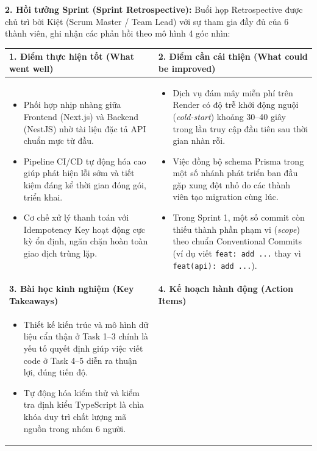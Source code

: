 \documentclass[a4paper]{article}
\begin{document}
\noindent\textbf{2. Hồi tưởng Sprint (Sprint Retrospective):}
Buổi họp Retrospective được chủ trì bởi Kiệt (Scrum Master / Team Lead) với sự tham gia đầy đủ của 6 thành viên, ghi nhận các phản hồi theo mô hình 4 góc nhìn:

\begin{table}[H]
\centering
\small
\begin{tabularx}{\textwidth}{|X|X|}
\hline
\textbf{1. Điểm thực hiện tốt (What went well)} & \textbf{2. Điểm cần cải thiện (What could be improved)} \\
\hline
\begin{itemize}[leftmargin=10pt]
    \item Phối hợp nhịp nhàng giữa Frontend (Next.js) và Backend (NestJS) nhờ tài liệu đặc tả API chuẩn mực từ đầu.
    \item Pipeline CI/CD tự động hóa cao giúp phát hiện lỗi sớm và tiết kiệm đáng kể thời gian đóng gói, triển khai.
    \item Cơ chế xử lý thanh toán với Idempotency Key hoạt động cực kỳ ổn định, ngăn chặn hoàn toàn giao dịch trùng lặp.
\end{itemize} & 
\begin{itemize}[leftmargin=10pt]
    \item Dịch vụ đám mây miễn phí trên Render có độ trễ khởi động nguội (\textit{cold-start}) khoảng 30--40 giây trong lần truy cập đầu tiên sau thời gian nhàn rỗi.
    \item Việc đồng bộ schema Prisma trong một số nhánh phát triển ban đầu gặp xung đột nhỏ do các thành viên tạo migration cùng lúc.
    \item Trong Sprint 1, một số commit còn thiếu thành phần phạm vi (\textit{scope}) theo chuẩn Conventional Commits (ví dụ viết \texttt{feat: add ...} thay vì \texttt{feat(api): add ...}).
\end{itemize} \\
\hline
\textbf{3. Bài học kinh nghiệm (Key Takeaways)} & \textbf{4. Kế hoạch hành động (Action Items)} \\
\hline
\begin{itemize}[leftmargin=10pt]
    \item Thiết kế kiến trúc và mô hình dữ liệu cẩn thận ở Task 1--3 chính là yếu tố quyết định giúp việc viết code ở Task 4--5 diễn ra thuận lợi, đúng tiến độ.
    \item Tự động hóa kiểm thử và kiểm tra định kiểu TypeScript là chìa khóa duy trì chất lượng mã nguồn trong nhóm 6 người.
\end{itemize} & 

\end{tabularx}
\end{table}
\end{document}
